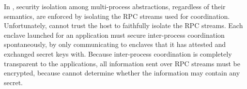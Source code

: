 In \graphene{}, security isolation among multi-process abstractions,
regardless of their semantics,
are enforced by isolating the RPC streams used for coordination.
Unfortunately, \sysname{} cannot trust the host to faithfully isolate
the RPC streams.
Each enclave launched for an application must secure inter-process coordination
spontaneously, by only communicating to enclaves that it has attested
and exchanged secret keys with.
Because inter-process coordination is completely transparent
to the applications,
all information sent over RPC streams must be encrypted,
because \libos{} cannot determine whether the information may contain any secret.





